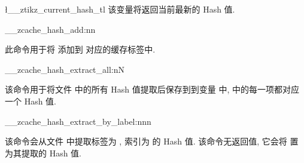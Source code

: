 \documentclass[
  hyper, lang=cn, 
  class=l3dox, 
]{../../zlatex/code/ztex}
\begin{document}
\begin{function}[added=2025-05-30]{\l__ztikz_current_hash_tl}
  该变量将返回当前最新的 Hash 值.
\end{function}


\begin{function}[added=2025-05-30]{\__zcache_hash_add:nn}
  \begin{syntax}
     
  \end{syntax}
  此命令用于将  添加到  对应的缓存标签中.
\end{function}


\begin{function}[added=2025-05-30]{\__zcache_hash_extract_all:nN}
  \begin{syntax}
     
  \end{syntax}
  该命令用于将文件  中的所有 Hash 值提取后保存到到变量  中,
   中的每一项都对应一个 Hash 值.
\end{function}


\begin{function}[added=2025-05-30]{\__zcache_hash_extract_by_label:nnn}
  \begin{syntax}
     
  \end{syntax}
  该命令会从文件  中提取标签为 , 索引为  的 Hash 值.
  该命令无返回值, 它会将  置为其提取的 Hash 值. 
\end{function}


\clearpage
\end{document}
